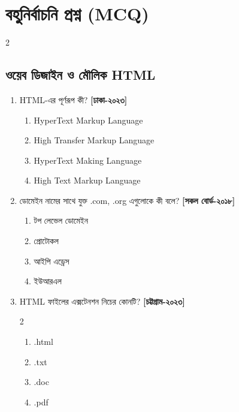 \section{বহুনির্বাচনি প্রশ্ন (MCQ)}

\begin{multicols}{2}
\subsection*{ওয়েব ডিজাইন ও মৌলিক HTML}

\begin{enumerate}[series=chFourFinalQuestions]

\item \begin{minipage}[t]{\linewidth}
HTML-এর পূর্ণরূপ কী? \textbf{[ঢাকা-২০২৩]}
\begin{enumerate}[label=\alph*)]
\item HyperText Markup Language 
\item High Transfer Markup Language
\item HyperText Making Language
\item High Text Markup Language
\end{enumerate}


\end{minipage}

\item \begin{minipage}[t]{\linewidth}
ডোমেইন নামের সাথে যুক্ত .com, .org এগুলোকে কী বলে? \textbf{[সকল বোর্ড-২০১৮]}
\begin{enumerate}[label=\alph*)]
\item টপ লেভেল ডোমেইন 
\item প্রোটোকল
\item আইপি এড্রেস
\item ইউআরএল
\end{enumerate}


\end{minipage}

\item \begin{minipage}[t]{\linewidth}
HTML ফাইলের এক্সটেনশন নিচের কোনটি? \textbf{[চট্টগ্রাম-২০২৩]}
\begin{multicols}{2}
\begin{enumerate}[label=\alph*)]
\item .html 
\item .txt
\item .doc
\item .pdf
\end{enumerate}
\end{multicols}
\par\addvspace{2pt}



\end{minipage}
\end{enumerate}
\end{multicols}
